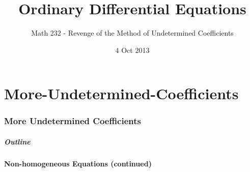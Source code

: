 \part{More-Undetermined-Coefficients}
\section{More Undetermined Coefficients}

\title{Ordinary Differential Equations}
\subtitle{Math 232 - Revenge of the Method of Undetermined Coefficients}
\date{4 Oct 2013}

\begin{frame}
  \titlepage
\end{frame}

\begin{frame}
  \frametitle{Outline}
  \tableofcontents[ currentsection ]
\end{frame}


\subsection{Non-homogeneous Equations (continued)}


